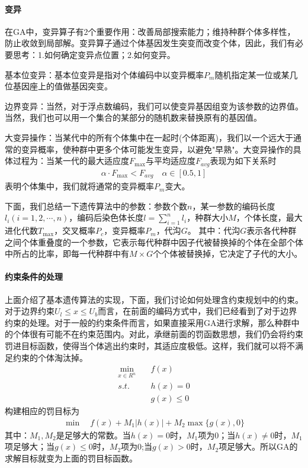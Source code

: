             \paragraph{变异}
            在GA中，变异算子有2个重要作用：改善局部搜索能力；维持种群个体多样性，防止收敛到局部解。变异算子通过个体基因发生突变而改变个体，因此，我们有必要思考：1.如何确定变异点位置；2.如何变异。
            \par
            基本位变异：基本位变异是指对个体编码中以变异概率$P_m$随机指定某一位或某几位基因座上的值做基因突变。
            \par
            边界变异：当然，对于浮点数编码，我们可以使变异基因组变为该参数的边界值。当然，我们也可以用一个集合的某部分的随机数来替换原有的基因值。
            \par
            大变异操作：当某代中的所有个体集中在一起时(个体距离)，我们以一个远大于通常的变异概率，使种群中更多个体可能发生变异，以避免"早熟"。大变异操作的具体过程为：当某一代的最大适应度$F_{\max}$与平均适应度$F_{avg}$表现为如下关系时
            \begin{align*}
            \alpha \cdot F_{\max}<F_{avg}\quad \alpha \in [0.5,1]
            \end{align*}
            表明个体集中，我们就将通常的变异概率$P_m$变大。
            \par
            下面，我们总结一下遗传算法中的参数：参数个数$n$，某一参数的编码长度$l_i(i=1,2,\cdots,n)$，编码后染色体长度$l=\mathop{\sum}\limits_{i=1}^nl_i$，种群大小$M$，个体长度，最大进化代数$T_{\max}$，交叉概率$P_c$，变异概率$P_m$，代沟$G$。
            其中：代沟$G$表示各代种群之间个体重叠度的一个参数，它表示每代种群中因子代被替换掉的个体在全部个体中所占的比率，即每一代种群中有$M\times G$个个体被替换掉，它决定了子代的大小。
            \paragraph{约束条件的处理}
            上面介绍了基本遗传算法的实现，下面，我们讨论如何处理含约束规划中的约束。对于边界约束$U_l\leqslant x \leqslant U_b$而言，在前面的编码方式中，我们已经看到了对于边界约束的处理。对于一般的约束条件而言，如果直接采用GA进行求解，那么种群中的个体很有可能不在约束范围内。对此，承继前面的罚函数思想，我们仍会将约束罚进目标函数，使得当个体逃出约束时，其适应度极低。这样，我们就可以将不满足约束的个体淘汰掉。
            \begin{align*}
            \mathop{\min}\limits_{x\in R^n}\quad & f(x)\\
            s.t.\quad & h(x)=0\\
            & g(x)\leqslant 0
            \end{align*}
            构建相应的罚目标为
            \begin{align*}
            {\min}\quad f(x)+M_1|h(x)|+M_2{\max}\{g(x),0\}
            \end{align*}
            其中：$M_1,M_2$是足够大的常数。当$h(x)=0$时，$M_1$项为0；当$h(x)\neq 0$时，$M_1$项足够大；当$g(x) \leqslant 0$时，$M_2$项为0;当$g(x) > 0$时，$M_2$项足够大。所以GA的求解目标就变为上面的罚目标函数。
